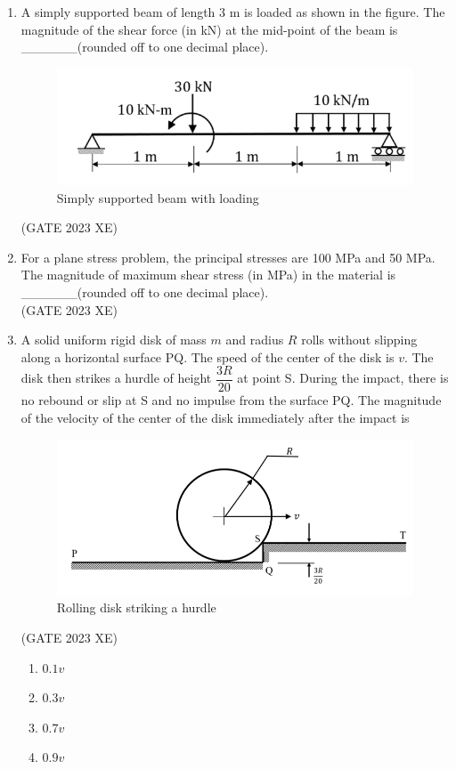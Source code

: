 \documentclass[journal,12pt,onecolumn]{IEEEtran}
\begin{document}
\begin{enumerate}
\newpage

\item A simply supported beam of length 3 m is loaded as shown in the figure. The
magnitude of the shear force (in kN) at the mid-point of the beam
is \_\_\_\_\_\_(rounded off to one decimal place).


\begin{figure}[htbp]
\centering
\includegraphics[width=0.6\columnwidth]{figs/C/fig7.png}
\caption{Simply supported beam with loading}
\label{fig:figs/C/fig7.png}
\end{figure}
\hfill{(GATE 2023 XE)}

\item For a plane stress problem, the principal stresses are 100 MPa and 50 MPa. The
magnitude of maximum shear stress (in MPa) in the material is \_\_\_\_\_\_(rounded off to one decimal place).\\
\hfill{(GATE 2023 XE)}

\item A solid uniform rigid disk of mass $m$ and radius $R$ rolls without slipping along a
horizontal surface PQ. The speed of the center of the disk is $v$. The disk then
strikes a hurdle of height $\dfrac{3R}{20}$ at point S. During the impact, there is no rebound or
slip at S and no impulse from the surface PQ. The magnitude of the velocity of the
center of the disk immediately after the impact is\\

\begin{figure}[htbp]
\centering
\includegraphics[width=0.7\columnwidth]{figs/C/fig8.png}
\caption{Rolling disk striking a hurdle}
\label{fig:figs/C/fig8.png}
\end{figure}
\hfill{(GATE 2023 XE)}
\begin{multicols}{2}
\begin{enumerate}
\item $0.1v$
\item $0.3v$
\item $0.7v$
\item $0.9v$
\end{enumerate}
\end{multicols}


\end{enumerate}
\end{document}

